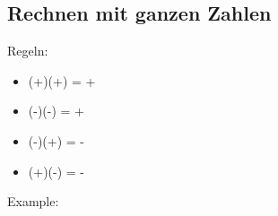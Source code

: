 \newpage
\subsection{Rechnen mit ganzen Zahlen}

Regeln:\\
\begin{itemize}
    \item (+)(+) = +
    \item (-)(-) = +
    \item (-)(+) = -
    \item (+)(-) = -
\end{itemize}

\hfill \break
Example:\\
\fboxrule=0.8pt 